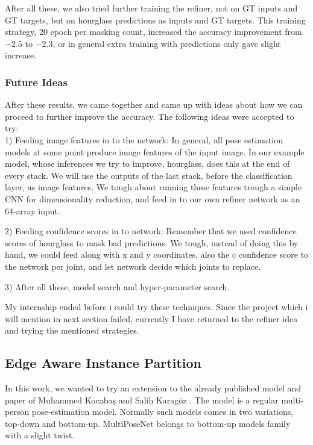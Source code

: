 \documentclass[titlepage, a4paper, 14pt]{extarticle} %
\begin{document}
After all these, we also tried further training the refiner, not on GT inputs and GT targets, but on hourglass predictions as inputs and GT targets. This training strategy, 20 epoch per masking count, increased the accuracy improvement from $-2.5$ to $-2.3$, or in general extra training with predictions only gave slight increase.

\subsubsection{Future Ideas} \label{testing}


After these results, we came together and came up with ideas about how we can proceed to further improve the accuracy. The following ideas were accepted to try: \\

1) Feeding image features in to the network: In general, all pose estimation models at some point produce image features of the input image. In our example model, whose inferences we try to improve, hourglass, does this at the end of every stack. We will use the outputs of the last stack, before the classification layer, as image features. We tough about running these features trough a simple CNN for dimensionality reduction, and feed in to our own refiner network as an 64-array input.

2) Feeding confidence scores in to network: Remember that we used confidence scores of hourglass to mask bad predictions. We tough, instead of doing this by hand, we could feed along with x and y coordinates, also the c confidence score to the network per joint, and let network decide which joints to replace.

3) After all these, model search and hyper-parameter search.

My internship ended before i could try these techniques. Since the project which i will mention in next section failed, currently I have returned to the refiner idea and trying the mentioned strategies.

\subsection{Edge Aware Instance Partition} \label{portal}

In this work, we wanted to try an extension to the already published model and paper of Muhammed Kocabaş and Salih Karagöz\cite{mpn} . The model is a regular multi-person pose-estimation model. Normally such models comes in two variations, top-down and bottom-up. MultiPoseNet belongs to bottom-up models family with a slight twist. \\
\end{document}
